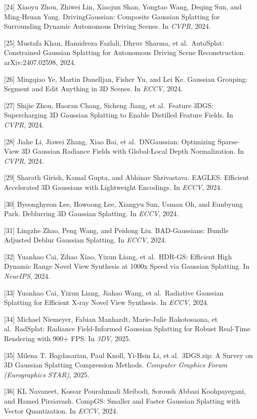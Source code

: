 {[}24{]} Xiaoyu Zhou, Zhiwei Lin, Xiaojun Shan, Yongtao Wang, Deqing Sun, and Ming-Hsuan Yang. DrivingGaussian: Composite Gaussian Splatting for Surrounding Dynamic Autonomous Driving Scenes. In \emph{CVPR}, 2024.

{[}25{]} Mustafa Khan, Hamidreza Fazlali, Dhruv Sharma, et al.~AutoSplat: Constrained Gaussian Splatting for Autonomous Driving Scene Reconstruction. arXiv:2407.02598, 2024.

{[}26{]} Mingqiao Ye, Martin Danelljan, Fisher Yu, and Lei Ke. Gaussian Grouping: Segment and Edit Anything in 3D Scenes. In \emph{ECCV}, 2024.

{[}27{]} Shijie Zhou, Haoran Chang, Sicheng Jiang, et al.~Feature 3DGS: Supercharging 3D Gaussian Splatting to Enable Distilled Feature Fields. In \emph{CVPR}, 2024.

{[}28{]} Jiahe Li, Jiawei Zhang, Xiao Bai, et al.~DNGaussian: Optimizing Sparse-View 3D Gaussian Radiance Fields with Global-Local Depth Normalization. In \emph{CVPR}, 2024.

{[}29{]} Sharath Girish, Kamal Gupta, and Abhinav Shrivastava. EAGLES: Efficient Accelerated 3D Gaussians with Lightweight Encodings. In \emph{ECCV}, 2024.

{[}30{]} Byeonghyeon Lee, Howoong Lee, Xiangyu Sun, Usman Oh, and Eunbyung Park. Deblurring 3D Gaussian Splatting. In \emph{ECCV}, 2024.

{[}31{]} Lingzhe Zhao, Peng Wang, and Peidong Liu. BAD-Gaussians: Bundle Adjusted Deblur Gaussian Splatting. In \emph{ECCV}, 2024.

{[}32{]} Yuanhao Cai, Zihao Xiao, Yixun Liang, et al.~HDR-GS: Efficient High Dynamic Range Novel View Synthesis at 1000x Speed via Gaussian Splatting. In \emph{NeurIPS}, 2024.

{[}33{]} Yuanhao Cai, Yixun Liang, Jiahao Wang, et al.~Radiative Gaussian Splatting for Efficient X-ray Novel View Synthesis. In \emph{ECCV}, 2024.

{[}34{]} Michael Niemeyer, Fabian Manhardt, Marie-Julie Rakotosaona, et al.~RadSplat: Radiance Field-Informed Gaussian Splatting for Robust Real-Time Rendering with 900+ FPS. In \emph{3DV}, 2025.

{[}35{]} Milena T. Bagdasarian, Paul Knoll, Yi-Hsin Li, et al.~3DGS.zip: A Survey on 3D Gaussian Splatting Compression Methods. \emph{Computer Graphics Forum (Eurographics STAR)}, 2025.

{[}36{]} KL Navaneet, Kossar Pourahmadi Meibodi, Soroush Abbasi Koohpayegani, and Hamed Pirsiavash. CompGS: Smaller and Faster Gaussian Splatting with Vector Quantization. In \emph{ECCV}, 2024.

